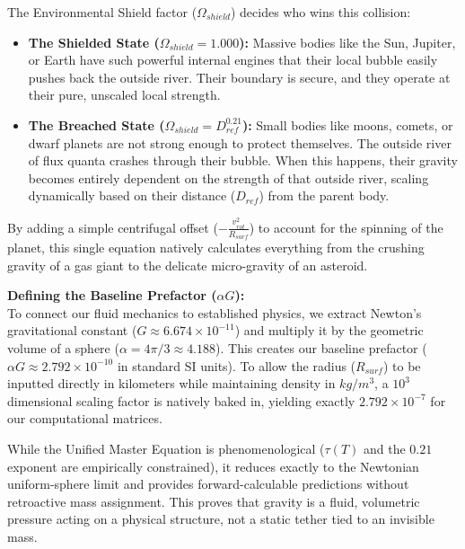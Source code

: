 \documentclass[11pt, a4paper]{article}
\begin{document}
  The Environmental Shield factor ($\Omega_{shield}$) decides who wins this collision:
  \begin{itemize}
    \item \textbf{The Shielded State ($\Omega_{shield} = 1.000$):} Massive bodies like the Sun, Jupiter, or Earth have such powerful internal engines that their local bubble easily pushes back the outside river. Their boundary is secure, and they operate at their pure, unscaled local strength.
    \item \textbf{The Breached State ($\Omega_{shield} = D_{ref}^{0.21}$):} Small bodies like moons, comets, or dwarf planets are not strong enough to protect themselves. The outside river of flux quanta crashes through their bubble. When this happens, their gravity becomes entirely dependent on the strength of that outside river, scaling dynamically based on their distance ($D_{ref}$) from the parent body.
  \end{itemize}

  By adding a simple centrifugal offset ($-\frac{v_{rot}^2}{R_{surf}}$) to account for the spinning of the planet, this single equation natively calculates everything from the crushing gravity of a gas giant to the delicate micro-gravity of an asteroid. 
  
  \textbf{Defining the Baseline Prefactor ($\alpha G$):} \\
  To connect our fluid mechanics to established physics, we extract Newton's gravitational constant ($G \approx 6.674 \times 10^{-11}$) and multiply it by the geometric volume of a sphere ($\alpha = 4\pi/3 \approx 4.188$). This creates our baseline prefactor ($\alpha G \approx 2.792 \times 10^{-10}$ in standard SI units). To allow the radius ($R_{surf}$) to be inputted directly in kilometers while maintaining density in $kg/m^3$, a $10^3$ dimensional scaling factor is natively baked in, yielding exactly $2.792 \times 10^{-7}$ for our computational matrices. 
  
  While the Unified Master Equation is phenomenological ($\tau(T)$ and the $0.21$ exponent are empirically constrained), it reduces exactly to the Newtonian uniform-sphere limit and provides forward-calculable predictions without retroactive mass assignment. This proves that gravity is a fluid, volumetric pressure acting on a physical structure, not a static tether tied to an invisible mass.

\end{document}
